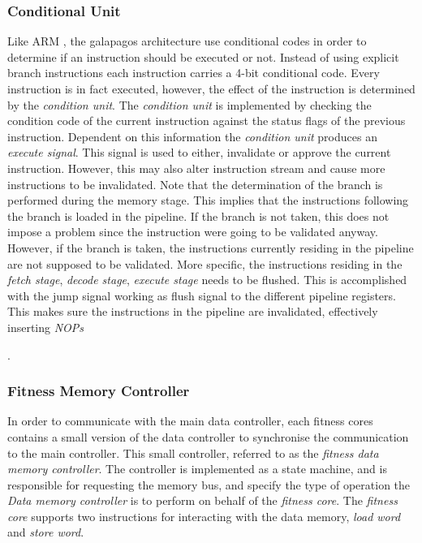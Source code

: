 \subsubsection{Conditional Unit}
Like ARM , the galapagos architecture use conditional codes in order to determine if an instruction should be executed or not. Instead of using explicit branch instructions each instruction carries a 4-bit conditional code. Every instruction is in fact executed, however, the effect of the instruction is determined by the \emph{condition unit}. The \emph{condition unit} is implemented by checking the condition code of the current instruction against the status flags of the previous instruction. Dependent on this information the \emph{condition unit} produces an \emph{execute signal}. This signal is used to either, invalidate or approve the current instruction. However, this may also alter instruction stream and cause more instructions to be invalidated. Note that the determination of the branch is performed during the memory stage. This implies that the instructions following the branch is loaded in the pipeline. If the branch is not taken, this does not impose a problem since the instruction were going to be validated anyway. However, if the branch is taken, the instructions currently residing in the pipeline are not supposed to be validated. More specific, the instructions residing in the \emph{fetch stage}, \emph{decode stage}, \emph{execute stage} needs to be flushed. This is accomplished with the jump signal working as flush signal to the different pipeline registers. This makes sure the instructions in the pipeline are invalidated, effectively inserting \emph{NOPs}




.




\subsubsection{Fitness Memory Controller} 
In order to communicate with the main data controller, each fitness cores contains a small version of the data controller to synchronise the communication to the main controller. This small controller, referred to as the \emph{fitness data memory controller}. The controller is implemented as a state machine, and is responsible for requesting the memory bus, and specify the type of operation the \emph{Data memory controller} is to perform on behalf of the \emph{fitness core}.  The \emph{fitness core} supports two instructions for interacting with the data memory,  \emph{load word} and \emph{store word}. 

